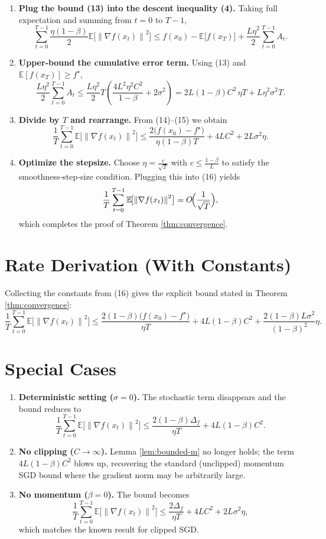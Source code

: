 \documentclass{article}
\newcommand{\EE}{\mathbb{E}}
\newcommand{\norm}[1]{\left\lVert#1\right\rVert}
\newcommand{\grad}{\nabla}
\begin{document}
\begin{enumerate}
\item[Step 7.] \textbf{Plug the bound (13) into the descent inequality (4).}
Taking full expectation and summing from $t=0$ to $T-1$,
\[
\sum_{t=0}^{T-1}\frac{\eta(1-\beta)}{2}\EE\!\bigl[\norm{\grad f(x_t)}^2\bigr]
\le f(x_0)-\EE\!\bigl[f(x_T)\bigr]
+\frac{L\eta^2}{2}\sum_{t=0}^{T-1}A_t . \tag{14}
\]

\item[Step 8.] \textbf{Upper‑bound the cumulative error term.}
Using (13) and $\EE[f(x_T)]\ge f^\star$,
\[
\frac{L\eta^2}{2}\sum_{t=0}^{T-1}A_t
\le \frac{L\eta^2}{2}T\!\left(
\frac{4L^2\eta^2C^2}{1-\beta}+2\sigma^2\right)
=2L(1-\beta)C^2\,\eta T
+L\eta^2\sigma^2 T . \tag{15}
\]

\item[Step 9.] \textbf{Divide by $T$ and rearrange.}
From (14)–(15) we obtain
\[
\frac{1}{T}\sum_{t=0}^{T-1}\EE\!\bigl[\norm{\grad f(x_t)}^2\bigr]
\le
\frac{2\bigl(f(x_0)-f^\star\bigr)}{\eta(1-\beta)T}
+4L C^2
+2L\sigma^2\eta .
\tag{16}
\]

\item[Step 10.] \textbf{Optimize the stepsize.}
Choose $\eta = \frac{c}{\sqrt{T}}$ with $c\le\frac{1-\beta}{L}$ to satisfy the
smoothness‑step‑size condition. Plugging this into (16) yields
\[
\frac{1}{T}\sum_{t=0}^{T-1}\EE\!\bigl[\norm{\grad f(x_t)}^2\bigr]
= O\!\Bigl(\frac{1}{\sqrt{T}}\Bigr),
\]
which completes the proof of Theorem \ref{thm:convergence}. \qedhere
\end{enumerate}

\section*{Rate Derivation (With Constants)}
Collecting the constants from (16) gives the explicit bound stated in
Theorem \ref{thm:convergence}:
\[
\boxed{
\frac{1}{T}\sum_{t=0}^{T-1}\EE\!\bigl[\norm{\grad f(x_t)}^2\bigr]
\le
\frac{2(1-\beta)\bigl(f(x_0)-f^\star\bigr)}{\eta T}
+4L(1-\beta)C^2
+\frac{2(1-\beta)L\sigma^2}{(1-\beta)^2}\eta } .
\]

\section*{Special Cases}
\begin{enumerate}
\item \textbf{Deterministic setting ($\sigma=0$).} The stochastic term disappears and
the bound reduces to
\[
\frac{1}{T}\sum_{t=0}^{T-1}\EE\!\bigl[\norm{\grad f(x_t)}^2\bigr]
\le
\frac{2(1-\beta)\Delta_f}{\eta T}+4L(1-\beta)C^2 .
\]
\item \textbf{No clipping ($C\to\infty$).} Lemma \ref{lem:bounded-m} no longer holds;
the term $4L(1-\beta)C^2$ blows up, recovering the standard (unclipped) momentum
SGD bound where the gradient norm may be arbitrarily large.
\item \textbf{No momentum ($\beta=0$).} The bound becomes
\[
\frac{1}{T}\sum_{t=0}^{T-1}\EE\!\bigl[\norm{\grad f(x_t)}^2\bigr]
\le
\frac{2\Delta_f}{\eta T}+4LC^2+2L\sigma^2\eta ,
\]
which matches the known result for clipped SGD.
\end{enumerate}
\end{document}
